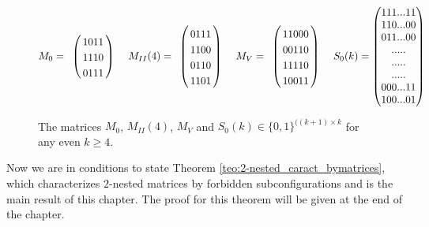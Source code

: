 \documentclass[12pt]{book}
\theoremstyle{plain}
\theoremstyle{remark}
\begin{document}
\begin{figure}[H]
	\centering
	\footnotesize{
	\begin{align*}
			M_0 = \bordermatrix{ & \cr
						 & 1 0 1 1 \cr
		  				 & 1 1 1 0  \cr
						 & 0 1 1 1 }\
			&&
			M_{II}(4) = \bordermatrix{ & \cr
						 & 0 1 1 1 \cr
		  				 & 1 1 0 0  \cr
						 & 0 1 1 0 \cr
						 & 1 1 0 1 }\
			&&
			M_V = \bordermatrix{ & \cr
						 & 1 1 0 0 0 \cr
		  				 & 0 0 1 1 0  \cr
						 & 1 1 1 1 0 \cr
						 & 1 0 0 1 1 }\
			&&
			S_0(k)&= \begin{pmatrix}
			 	1 11...11\\
				110...00\\
				011...00\\
				.   .   .   .   . \\
				.   .   .   .   . \\
				.   .   .   .   . \\
				000...11\\
				100...01\\
			\end{pmatrix}
	\end{align*}
	}
	\caption{The matrices $M_0$, $M_{II}(4)$, $M_V$ and $S_0(k) \in \{0,1\}^{((k+1)\times k}$ for any even $k \geq 4$.} 
	\label{fig:forb_M_chiquitas}
	\end{figure}




Now we are in conditions to state Theorem \ref{teo:2-nested_caract_bymatrices}, which characterizes $2$-nested matrices by forbidden subconfigurations and is the main result of this chapter. The proof for this theorem will be given at the end of the chapter.
 
\end{document}
